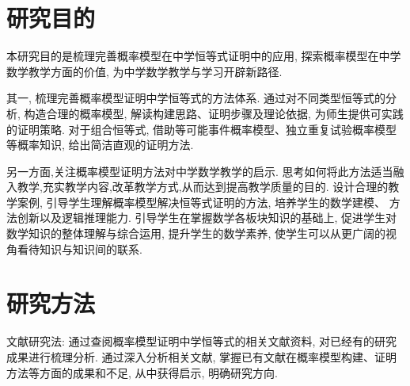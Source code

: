 


\section{研究目的}
本研究目的是梳理完善概率模型在中学恒等式证明中的应用, 探索概率模型在中学数学教学方面的价值, 为中学数学教学与学习开辟新路径. 

其一, 梳理完善概率模型证明中学恒等式的方法体系. 通过对不同类型恒等式的分析, 构造合理的概率模型, 解读构建思路、证明步骤及理论依据, 为师生提供可实践的证明策略. 对于组合恒等式, 借助等可能事件概率模型、独立重复试验概率模型等概率知识, 给出简洁直观的证明方法. 

另一方面,关注概率模型证明方法对中学数学教学的启示. 思考如何将此方法适当融入教学,充实教学内容,改革教学方式,从而达到提高教学质量的目的. 设计合理的教学案例, 引导学生理解概率模型解决恒等式证明的方法, 培养学生的数学建模、 方法创新以及逻辑推理能力. 引导学生在掌握数学各板块知识的基础上, 促进学生对数学知识的整体理解与综合运用, 提升学生的数学素养, 使学生可以从更广阔的视角看待知识与知识间的联系. 

\section{研究方法}
文献研究法: 通过查阅概率模型证明中学恒等式的相关文献资料, 对已经有的研究成果进行梳理分析. 通过深入分析相关文献, 掌握已有文献在概率模型构建、证明方法等方面的成果和不足, 从中获得启示, 明确研究方向. 

